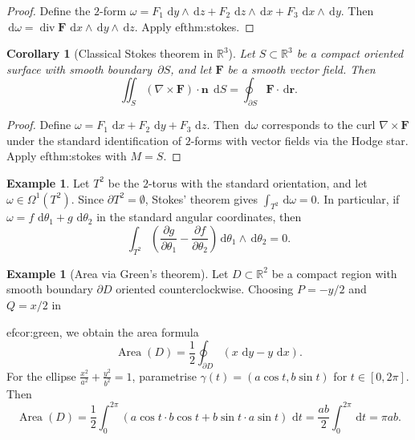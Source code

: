 \documentclass[12pt,a4paper,openany]{book}
\newtheorem{corollary}[theorem]{Corollary}
\theoremstyle{definition}
\newtheorem{example}[theorem]{Example}
\theoremstyle{remark}
\newcommand{\R}{\mathbb{R}}
\newcommand{\dd}{\,\mathrm{d}}
\begin{document}
\begin{proof}
Define the $2$-form
$\omega = F_1\,\dd y\wedge\dd z + F_2\,\dd z\wedge\dd x + F_3\,\dd x\wedge\dd y$.
Then $\dd\omega = \operatorname{div}\mathbf{F}\,\dd x\wedge\dd y\wedge\dd z$.
Apply 
ef{thm:stokes}.
\end{proof}

\begin{corollary}[Classical Stokes theorem in $\R^3$]\label{cor:classical-stokes}
Let $S\subset\R^3$ be a compact oriented surface with smooth
boundary~$\partial S$, and let $\mathbf{F}$ be a smooth vector field.
Then
\[
  \iint_S (\nabla\times\mathbf{F})\cdot\mathbf{n}\;\dd S
  = \oint_{\partial S} \mathbf{F}\cdot\dd\mathbf{r}.
\]
\end{corollary}

\begin{proof}
Define $\omega = F_1\,\dd x + F_2\,\dd y + F_3\,\dd z$.  Then $\dd\omega$
corresponds to the curl $\nabla\times\mathbf{F}$ under the standard
identification of $2$-forms with vector fields via the Hodge star.
Apply 
ef{thm:stokes} with $M = S$.
\end{proof}

\begin{example}\label{ex:stokes-torus}
Let $T^2$ be the $2$-torus with the standard orientation, and let
$\omega\in\Omega^1(T^2)$.  Since $\partial T^2 = \emptyset$,
Stokes' theorem gives
$\int_{T^2}\dd\omega = 0$.
In particular, if $\omega = f\,\dd\theta_1 + g\,\dd\theta_2$ in
the standard angular coordinates, then
\[
  \int_{T^2}\left(\frac{\partial g}{\partial\theta_1}
  - \frac{\partial f}{\partial\theta_2}\right)\dd\theta_1\wedge\dd\theta_2 = 0.
\]
\end{example}

\begin{example}[Area via Green's theorem]\label{ex:area-green}
Let $D\subset\R^2$ be a compact region with smooth boundary $\partial D$
oriented counterclockwise.  Choosing $P = -y/2$ and $Q = x/2$ in

ef{cor:green}, we obtain the area formula
\[
  \operatorname{Area}(D) = \frac{1}{2}\oint_{\partial D}(x\,\dd y - y\,\dd x).
\]
For the ellipse $\frac{x^2}{a^2}+\frac{y^2}{b^2}=1$, parametrise
$\gamma(t) = (a\cos t, b\sin t)$ for $t\in[0,2\pi]$.  Then
\[
  \operatorname{Area}(D) = \frac{1}{2}\int_0^{2\pi}
  (a\cos t\cdot b\cos t + b\sin t\cdot a\sin t)\,\dd t
  = \frac{ab}{2}\int_0^{2\pi}\dd t = \pi ab.
\]
\end{example}
\end{document}
